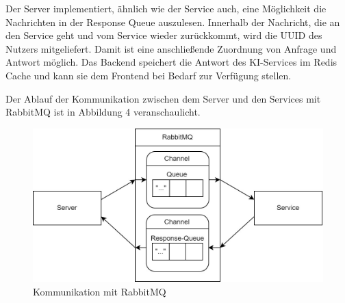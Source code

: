 Der Server implementiert, ähnlich wie der Service auch, eine Möglichkeit die Nachrichten in der Response Queue auszulesen. Innerhalb der Nachricht, die an den Service geht und vom Service wieder zurückkommt, wird die UUID des Nutzers mitgeliefert. Damit ist eine anschließende Zuordnung von Anfrage und Antwort möglich. Das Backend speichert die Antwort des KI-Services im Redis Cache und kann sie dem Frontend bei Bedarf zur Verfügung stellen.

Der Ablauf der Kommunikation zwischen dem Server und den Services mit RabbitMQ ist in Abbildung 4 veranschaulicht. 
\begin{figure}[H]
  \centering
    \includegraphics[width = 15cm]{bilder/Rabbit3}
    \caption{Kommunikation mit RabbitMQ}
\end{figure}

